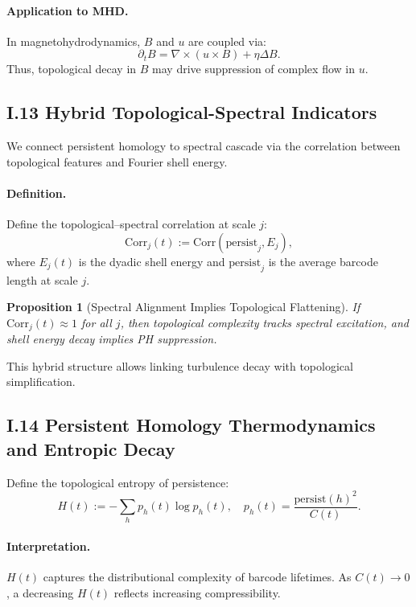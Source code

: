 \documentclass[11pt]{article}
\newtheorem{proposition}[theorem]{Proposition}
\theoremstyle{definition}
\begin{document}
\paragraph{Application to MHD.}
In magnetohydrodynamics, $B$ and $u$ are coupled via:
\[ \partial_t B = \nabla \times (u \times B) + \eta \Delta B. \]
Thus, topological decay in $B$ may drive suppression of complex flow in $u$.

\subsection*{I.13 Hybrid Topological-Spectral Indicators}

We connect persistent homology to spectral cascade via the correlation between topological features and Fourier shell energy.

\paragraph{Definition.} Define the topological–spectral correlation at scale $j$:
\[ \mathrm{Corr}_j(t) := \mathrm{Corr}(\text{persist}_j, E_j), \]
where $E_j(t)$ is the dyadic shell energy and $\text{persist}_j$ is the average barcode length at scale $j$.

\begin{proposition}[Spectral Alignment Implies Topological Flattening]
If $\mathrm{Corr}_j(t) \approx 1$ for all $j$, then topological complexity tracks spectral excitation, and shell energy decay implies PH suppression.
\end{proposition}

This hybrid structure allows linking turbulence decay with topological simplification.

\subsection*{I.14 Persistent Homology Thermodynamics and Entropic Decay}

Define the topological entropy of persistence:
\[ H(t) := -\sum_h p_h(t) \log p_h(t), \quad p_h(t) = \frac{\text{persist}(h)^2}{C(t)}. \]

\paragraph{Interpretation.} $H(t)$ captures the distributional complexity of barcode lifetimes.
As $C(t) \to 0$, a decreasing $H(t)$ reflects increasing compressibility.
\end{document}
